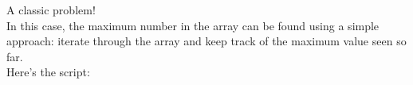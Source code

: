 \documentclass[preview]{standalone}
\begin{document}
A classic problem!\\In this case, the maximum number in the array can be found using a simple approach: iterate through the array and keep track of the maximum value seen so far.\\Here's the script:\\
\end{document}
